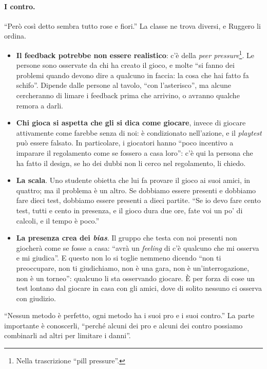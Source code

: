 \paragraph{I contro.} ``Però così detto sembra tutto rose e fiori.'' La classe ne trova
diversi, e Ruggero li ordina.
\begin{itemize}
  \item \textbf{Il feedback potrebbe non essere realistico}: c'è della \emph{peer
        pressure}\footnote{Nella trascrizione ``pill pressure''.}. Le persone sono
        osservate da chi ha creato il gioco, e molte ``si fanno dei problemi quando devono
        dire a qualcuno in faccia: la cosa che hai fatto fa schifo''. Dipende dalle
        persone al tavolo, ``con l'asterisco'', ma alcune cercheranno di limare i
        feedback prima che arrivino, o avranno qualche remora a darli.
  \item \textbf{Chi gioca si aspetta che gli si dica come giocare}, invece di giocare
        attivamente come farebbe senza di noi: è condizionato nell'azione, e il
        \emph{playtest} può essere falsato. In particolare, i giocatori hanno ``poco
        incentivo a imparare il regolamento come se fossero a casa loro'': c'è qui la
        persona che ha fatto il design, se ho dei dubbi non li cerco nel regolamento, li
        chiedo.
  \item \textbf{La scala}. Uno studente obietta che lui fa provare il gioco ai suoi amici,
        in quattro; ma il problema è un altro. Se dobbiamo essere presenti e dobbiamo
        fare dieci test, dobbiamo essere presenti a dieci partite. ``Se io devo fare cento
        test, tutti e cento in presenza, e il gioco dura due ore, fate voi un po' di
        calcoli, e il tempo è poco.''
  \item \textbf{La presenza crea dei \emph{bias}}. Il gruppo che testa con noi presenti
        non giocherà come se fosse a casa: ``avrà un \emph{feeling} di c'è qualcuno che
        mi osserva e mi giudica''. E questo non lo si toglie nemmeno dicendo ``non ti
        preoccupare, non ti giudichiamo, non è una gara, non è un'interrogazione, non è
        un torneo'': qualcuno li sta osservando giocare. È per forza di cose un test
        lontano dal giocare in casa con gli amici, dove di solito nessuno ci osserva con
        giudizio.
\end{itemize}
``Nessun metodo è perfetto, ogni metodo ha i suoi pro e i suoi contro.'' La parte
importante è conoscerli, ``perché alcuni dei pro e alcuni dei contro possiamo combinarli
ad altri per limitare i danni''.

